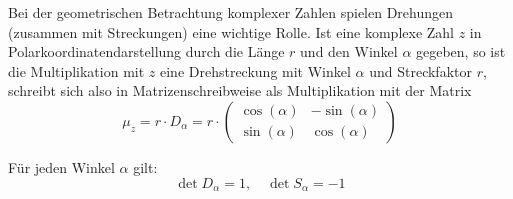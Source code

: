 \begin{notiz} 

Bei der geometrischen Betrachtung komplexer Zahlen spielen Drehungen (zusammen mit Streckungen) eine 
wichtige Rolle. Ist eine komplexe Zahl $z$ in Polarkoordinatendarstellung durch die Länge $r$ und den Winkel 
$\alpha$ gegeben, so ist die Multiplikation mit $z$ eine Drehstreckung mit Winkel $\alpha$ und Streckfaktor $r$, 
schreibt sich also in Matrizenschreibweise als Multiplikation mit der Matrix
  	$$ \mu_z = r \cdot D_{\alpha} = r \cdot \left( \begin{matrix} \cos(\alpha) & -\sin(\alpha) \\ 
      \sin(\alpha) & \cos(\alpha) \end{matrix} \right) $$
\end{notiz}

\begin{notiz} Für jeden Winkel $\alpha$ gilt:
  	$$ \det{D_{\alpha}} = 1, \quad \det{S_{\alpha}} = -1 $$
\end{notiz}

